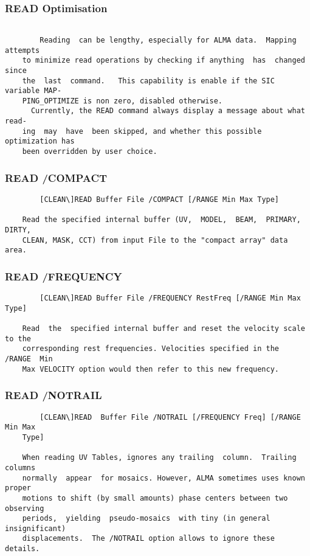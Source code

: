 \subsubsection{READ Optimisation}
\begin{verbatim}

        Reading  can be lengthy, especially for ALMA data.  Mapping attempts
    to minimize read operations by checking if anything  has  changed  since
    the  last  command.   This capability is enable if the SIC variable MAP-
    PING_OPTIMIZE is non zero, disabled otherwise.
      Currently, the READ command always display a message about what  read-
    ing  may  have  been skipped, and whether this possible optimization has
    been overridden by user choice.

\end{verbatim}
\subsubsection{READ /COMPACT}
\begin{verbatim}
        [CLEAN\]READ Buffer File /COMPACT [/RANGE Min Max Type]

    Read the specified internal buffer (UV,  MODEL,  BEAM,  PRIMARY,  DIRTY,
    CLEAN, MASK, CCT) from input File to the "compact array" data area.

\end{verbatim}
\subsubsection{READ /FREQUENCY}
\begin{verbatim}
        [CLEAN\]READ Buffer File /FREQUENCY RestFreq [/RANGE Min Max Type]

    Read  the  specified internal buffer and reset the velocity scale to the
    corresponding rest frequencies. Velocities specified in the  /RANGE  Min
    Max VELOCITY option would then refer to this new frequency.

\end{verbatim}
\subsubsection{READ /NOTRAIL}
\begin{verbatim}
        [CLEAN\]READ  Buffer File /NOTRAIL [/FREQUENCY Freq] [/RANGE Min Max
    Type]

    When reading UV Tables, ignores any trailing  column.  Trailing  columns
    normally  appear  for mosaics. However, ALMA sometimes uses known proper
    motions to shift (by small amounts) phase centers between two  observing
    periods,  yielding  pseudo-mosaics  with tiny (in general insignificant)
    displacements.  The /NOTRAIL option allows to ignore these details.

\end{verbatim}
